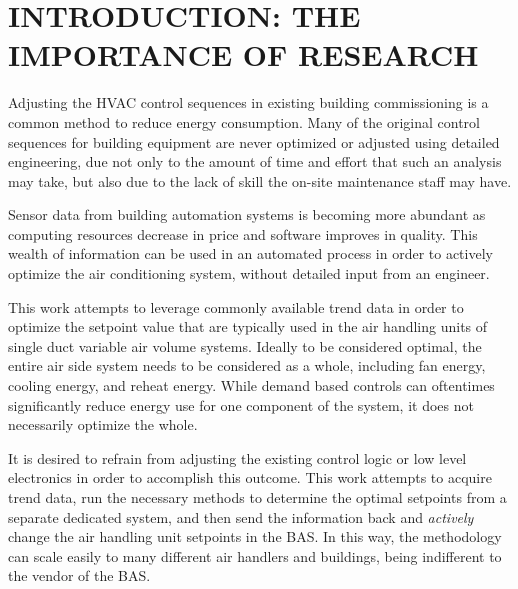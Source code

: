 %
%
%



\pagestyle{plain} %
\setcounter{page}{1}


\chapter{\uppercase {Introduction: The Importance of Research}}


Adjusting the HVAC control sequences in existing building commissioning is a common method to reduce energy consumption. Many of the original control sequences for building equipment are never optimized or adjusted using detailed engineering, due not only to the amount of time and effort that such an analysis may take, but also due to the lack of skill the on-site maintenance staff may have. 

Sensor data from building automation systems is becoming more abundant as computing resources decrease in price and software improves in quality. This wealth of information can be used in an automated process in order to actively optimize the air conditioning system, without detailed input from an engineer. 

This work attempts to leverage commonly available trend data in order to optimize the setpoint value that are typically used in the air handling units of single duct variable air volume systems. Ideally to be considered optimal, the entire air side system needs to be considered as a whole, including fan energy, cooling energy, and reheat energy. While demand based controls can oftentimes significantly reduce energy use for one component of the system, it does not necessarily optimize the whole. 

It is desired to refrain from adjusting the existing control logic or low level electronics in order to accomplish this outcome. This work attempts to acquire trend data, run the necessary methods to determine the optimal setpoints from a separate dedicated system, and then send the information back and \textit{actively} change the air handling unit setpoints in the BAS. In this way, the methodology can scale easily to many different air handlers and buildings, being indifferent to the vendor of the BAS.